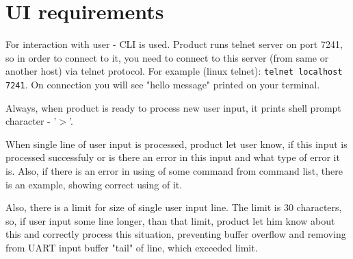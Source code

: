 \chapter*{UI requirements}

For interaction with user - CLI is used. Product runs telnet server on port 7241, so in order to connect to it, you need to connect to this server (from same or another host) via telnet protocol. For example (linux telnet): \texttt{telnet localhost 7241}. On connection you will see "hello message" printed on your terminal.

Always, when product is ready to process new user input, it prints shell prompt character - '$>$'.

When single line of user input is processed, product let user know, if this input is processed successfuly or is there an error in this input and what type of error it is. Also, if there is an error in using of some command from command list, there is an example, showing correct using of it.

Also, there is a limit for size of single user input line. The limit is 30 characters, so, if user input some line longer, than that limit, product let him know about this and correctly process this situation, preventing buffer overflow and removing from UART input buffer "tail" of line, which exceeded limit.

